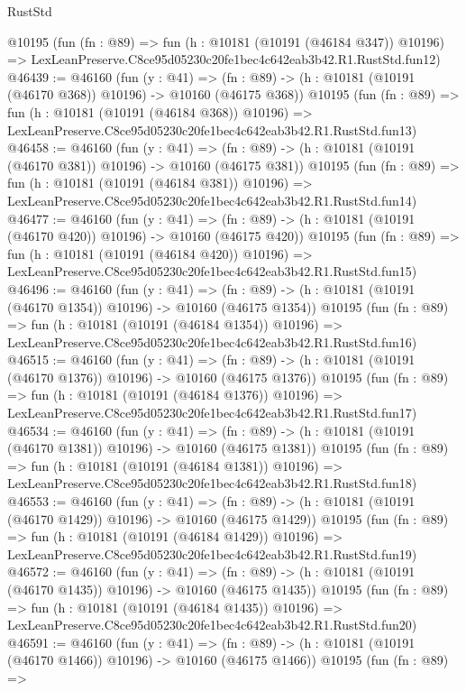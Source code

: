 \begin{lexlean}{RustStd}
\begin{coremodule}
    @10195
    (fun (fn : @89) =>
    fun (h : @10181 (@10191 (@46184 @347)) @10196) =>
    LexLeanPreserve.C8ce95d05230c20fe1bec4c642eab3b42.R1.RustStd.fun12)
@46439 := @46160
    (fun (y : @41) =>
    (fn : @89) -> (h : @10181 (@10191 (@46170 @368)) @10196) -> @10160 (@46175 @368))
    @10195
    (fun (fn : @89) =>
    fun (h : @10181 (@10191 (@46184 @368)) @10196) =>
    LexLeanPreserve.C8ce95d05230c20fe1bec4c642eab3b42.R1.RustStd.fun13)
@46458 := @46160
    (fun (y : @41) =>
    (fn : @89) -> (h : @10181 (@10191 (@46170 @381)) @10196) -> @10160 (@46175 @381))
    @10195
    (fun (fn : @89) =>
    fun (h : @10181 (@10191 (@46184 @381)) @10196) =>
    LexLeanPreserve.C8ce95d05230c20fe1bec4c642eab3b42.R1.RustStd.fun14)
@46477 := @46160
    (fun (y : @41) =>
    (fn : @89) -> (h : @10181 (@10191 (@46170 @420)) @10196) -> @10160 (@46175 @420))
    @10195
    (fun (fn : @89) =>
    fun (h : @10181 (@10191 (@46184 @420)) @10196) =>
    LexLeanPreserve.C8ce95d05230c20fe1bec4c642eab3b42.R1.RustStd.fun15)
@46496 := @46160
    (fun (y : @41) =>
    (fn : @89) -> (h : @10181 (@10191 (@46170 @1354)) @10196) -> @10160 (@46175 @1354))
    @10195
    (fun (fn : @89) =>
    fun (h : @10181 (@10191 (@46184 @1354)) @10196) =>
    LexLeanPreserve.C8ce95d05230c20fe1bec4c642eab3b42.R1.RustStd.fun16)
@46515 := @46160
    (fun (y : @41) =>
    (fn : @89) -> (h : @10181 (@10191 (@46170 @1376)) @10196) -> @10160 (@46175 @1376))
    @10195
    (fun (fn : @89) =>
    fun (h : @10181 (@10191 (@46184 @1376)) @10196) =>
    LexLeanPreserve.C8ce95d05230c20fe1bec4c642eab3b42.R1.RustStd.fun17)
@46534 := @46160
    (fun (y : @41) =>
    (fn : @89) -> (h : @10181 (@10191 (@46170 @1381)) @10196) -> @10160 (@46175 @1381))
    @10195
    (fun (fn : @89) =>
    fun (h : @10181 (@10191 (@46184 @1381)) @10196) =>
    LexLeanPreserve.C8ce95d05230c20fe1bec4c642eab3b42.R1.RustStd.fun18)
@46553 := @46160
    (fun (y : @41) =>
    (fn : @89) -> (h : @10181 (@10191 (@46170 @1429)) @10196) -> @10160 (@46175 @1429))
    @10195
    (fun (fn : @89) =>
    fun (h : @10181 (@10191 (@46184 @1429)) @10196) =>
    LexLeanPreserve.C8ce95d05230c20fe1bec4c642eab3b42.R1.RustStd.fun19)
@46572 := @46160
    (fun (y : @41) =>
    (fn : @89) -> (h : @10181 (@10191 (@46170 @1435)) @10196) -> @10160 (@46175 @1435))
    @10195
    (fun (fn : @89) =>
    fun (h : @10181 (@10191 (@46184 @1435)) @10196) =>
    LexLeanPreserve.C8ce95d05230c20fe1bec4c642eab3b42.R1.RustStd.fun20)
@46591 := @46160
    (fun (y : @41) =>
    (fn : @89) -> (h : @10181 (@10191 (@46170 @1466)) @10196) -> @10160 (@46175 @1466))
    @10195
    (fun (fn : @89) =>

\end{coremodule}
\end{lexlean}
